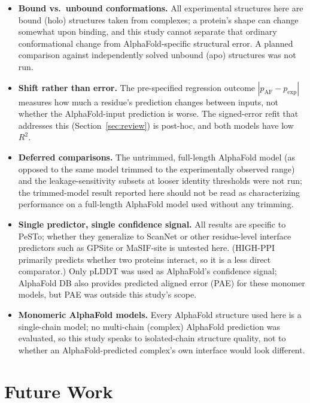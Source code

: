 \documentclass[10pt]{article}
\begin{document}
\begin{itemize}[nosep,leftmargin=1.4em]
therefore short resolved fragments, including the @@N_EXCLUDED@@ chains that
are entirely interface.
\item \textbf{Bound vs.\ unbound conformations.} All experimental structures
here are bound (holo) structures taken from complexes; a protein's shape can
change somewhat upon binding, and this study cannot separate that ordinary
conformational change from AlphaFold-specific structural error. A planned
comparison against independently solved unbound (apo) structures was not
run.
\item \textbf{Shift rather than error.} The pre-specified regression
outcome $|p_{\mathrm{AF}} - p_{\mathrm{exp}}|$ measures how much a
residue's prediction changes between inputs, not whether the AlphaFold-input
prediction is worse. The signed-error refit that addresses this (Section~\ref{sec:review}) is post-hoc,
and both models have low $R^2$.
\item \textbf{Deferred comparisons.} The untrimmed, full-length AlphaFold
model (as opposed to the same model trimmed to the experimentally observed
range) and the leakage-sensitivity subsets at looser identity thresholds
were not run; the trimmed-model result reported here should not be read as
characterizing performance on a full-length AlphaFold model used without any
trimming.
\item \textbf{Single predictor, single confidence signal.} All results are
specific to PeSTo; whether they generalize to ScanNet \cite{tubiana2022} or
other residue-level interface predictors such as GPSite \cite{yuan2024} or
MaSIF-site \cite{gainza2020} is untested here. (HIGH-PPI \cite{gao2023}
primarily predicts whether two proteins interact, so it is a less direct
comparator.) Only pLDDT was used as AlphaFold's confidence signal; AlphaFold
DB also provides predicted aligned error (PAE) for these monomer models, but
PAE was outside this study's scope.
\item \textbf{Monomeric AlphaFold models.} Every AlphaFold structure used here
is a single-chain model; no multi-chain (complex) AlphaFold prediction was
evaluated, so this study speaks to isolated-chain structure quality, not to
whether an AlphaFold-predicted complex's own interface would look different.
\end{itemize}

\section{Future Work}
\end{document}
